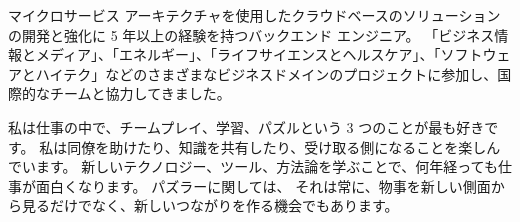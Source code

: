 

\begin{cvparagraph}

マイクロサービス アーキテクチャを使用したクラウドベースのソリューションの開発と強化に 5 年以上の経験を持つバックエンド エンジニア。 「ビジネス情報とメディア」、「エネルギー」、「ライフサイエンスとヘルスケア」、「ソフトウェアとハイテク」などのさまざまなビジネスドメインのプロジェクトに参加し、国際的なチームと協力してきました。

私は仕事の中で、チームプレイ、学習、パズルという 3 つのことが最も好きです。
  私は同僚を助けたり、知識を共有したり、受け取る側になることを楽しんでいます。 新しいテクノロジー、ツール、方法論を学ぶことで、何年経っても仕事が面白くなります。 パズラーに関しては、
  それは常に、物事を新しい側面から見るだけでなく、新しいつながりを作る機会でもあります。

\end{cvparagraph}
